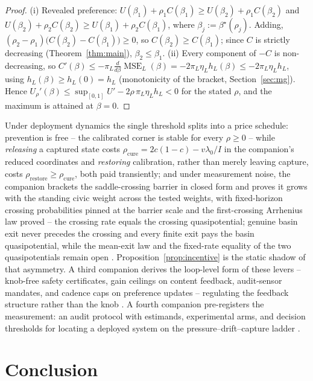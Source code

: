 \documentclass[11pt]{article}
\theoremstyle{definition}
\theoremstyle{remark}
\numberwithin{equation}{section}
\DeclareMathOperator{\MSE}{MSE}
\begin{document}
\begin{proof}
(i) Revealed preference: $U(\beta_1) + \rho_1 C(\beta_1) \ge U(\beta_2) + \rho_1 C(\beta_2)$ and $U(\beta_2) + \rho_2 C(\beta_2) \ge U(\beta_1) + \rho_2 C(\beta_1)$, where $\beta_j := \beta^\star(\rho_j)$. Adding, $(\rho_2 - \rho_1)\bigl(C(\beta_2) - C(\beta_1)\bigr) \ge 0$, so $C(\beta_2) \ge C(\beta_1)$; since $C$ is strictly decreasing (Theorem~\ref{thm:main}), $\beta_2 \le \beta_1$.
(ii) Every component of $-C$ is non-decreasing, so $C'(\beta) \le -\pi_L \tfrac{d}{d\beta}\MSE_L(\beta) = -2\pi_L \eta_L h_L(\beta) \le -2\pi_L \eta_L h_L$, using $h_L(\beta) \ge h_L(0) = h_L$ (monotonicity of the bracket, Section~\ref{sec:mg}). Hence $U_\rho'(\beta) \le \sup_{[0,1]} U' - 2\rho\, \pi_L \eta_L h_L < 0$ for the stated $\rho$, and the maximum is attained at $\beta = 0$.
\end{proof}

Under deployment dynamics the single threshold splits into a price schedule: prevention is free -- the calibrated corner is stable for every $\rho \ge 0$ -- while \emph{releasing} a captured state costs $\rho_{\mathrm{cure}} = 2c(1-c) - v\lambda_0/I$ in the companion's reduced coordinates and \emph{restoring} calibration, rather than merely leaving capture, costs $\rho_{\mathrm{restore}} \ge \rho_{\mathrm{cure}}$, both paid transiently; and under measurement noise, the companion brackets the saddle-crossing barrier in closed form and proves it grows with the standing civic weight across the tested weights, with fixed-horizon crossing probabilities pinned at the barrier scale and the first-crossing Arrhenius law proved -- the crossing rate equals the crossing quasipotential; genuine basin exit never precedes the crossing and every finite exit pays the basin quasipotential, while the mean-exit law and the fixed-rate equality of the two quasipotentials remain open \citep{hofheinz2026drift}. Proposition~\ref{prop:incentive} is the static shadow of that asymmetry. A third companion derives the loop-level form of these levers -- knob-free safety certificates, gain ceilings on content feedback, audit-sensor mandates, and cadence caps on preference updates -- regulating the feedback structure rather than the knob \citep{hofheinz2026loops}. A fourth companion pre-registers the measurement: an audit protocol with estimands, experimental arms, and decision thresholds for locating a deployed system on the pressure--drift--capture ladder \citep{hofheinz2026audit}.

\section{Conclusion}\label{sec:conclusion}
\end{document}
